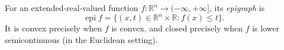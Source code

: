 
For an extended-real-valued function $f:\mathbb R^n\to(-\infty,+\infty]$, its \emph{epigraph} is
\[
\operatorname{epi}f=\{(x,t)\in\mathbb R^n\times\mathbb R:f(x)\le t\}.
\]
It is convex precisely when $f$ is convex, and closed precisely when $f$ is lower semicontinuous (in the Euclidean setting).
